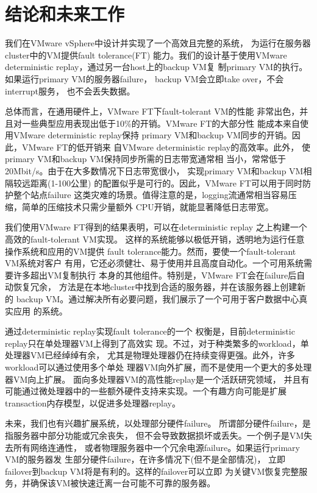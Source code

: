 \section{结论和未来工作}

我们在VMware vSphere中设计并实现了一个高效且完整的系统，%
为运行在服务器cluster中的VM提供fault tolerance(FT)%
能力。我们的设计基于使用VMware %
deterministic replay，通过另一台host上的backup VM复%
制primary VM的执行。如果运行primary VM的服务器failure，%
backup VM会立即take over，不会interrupt服务，%
也不会丢失数据。%

总体而言，在通用硬件上，VMware FT下fault-tolerant VM的性能%
非常出色，并且对一些典型应用表现出低于10\%的开销。VMware FT的大部分性%
能成本来自使用VMware deterministic replay保持%
primary VM和backup VM同步的开销。因此，VMware FT的低开销来%
自VMware deterministic replay的高效率。此外，%
使primary VM和backup VM保持同步所需的日志带宽通常相%
当小，常常低于20Mbit/s。由于在大多数情况下日志带宽很小，%
实现primary VM和backup VM相隔较远距离(1-100公里)%
的配置似乎是可行的。因此，VMware FT可以用于同时防护整个站点failure%
这类灾难的场景。值得注意的是，logging流通常相当容易压缩，简单的压缩技术只需少量额外%
CPU开销，就能显著降低日志带宽。%

我们使用VMware FT得到的结果表明，可以在deterministic replay%
之上构建一个高效的fault-tolerant VM实现。%
这样的系统能够以极低开销，透明地为运行任意操作系统和应用的VM提供%
fault tolerance能力。然而，要使一个fault-tolerant VM系统对客户%
有用，它还必须健壮、易于使用并且高度自动化。一个可用系统需要许多超出VM复制执行%
本身的其他组件。特别是，VMware FT会在failure后自动恢复冗余，%
方法是在本地cluster中找到合适的服务器，并在该服务器上创建新的%
backup VM。通过解决所有必要问题，我们展示了一个可用于客户数据中心真实应用%
的系统。%

通过deterministic replay实现fault tolerance的一个%
权衡是，目前deterministic replay只在单处理器VM上得到了高效实%
现。不过，对于种类繁多的workload，单处理器VM已经绰绰有余，%
尤其是物理处理器仍在持续变得更强。此外，许多workload可以通过使用多个单处%
理器VM向外扩展，而不是使用一个更大的多处理器VM向上扩展。%
面向多处理器VM的高性能replay是一个活跃研究领域，%
并且有可能通过微处理器中的一些额外硬件支持来实现。一个有趣方向可能是扩展%
transaction内存模型，以促进多处理器replay。%

未来，我们也有兴趣扩展系统，以处理部分硬件failure。%
所谓部分硬件failure，是指服务器中部分功能或冗余丧失，%
但不会导致数据损坏或丢失。一个例子是VM失去所有网络连通性，%
或者物理服务器中一个冗余电源failure。如果运行primary VM的服务器发%
生部分硬件failure，在许多情况下(但不是全部情况)，%
立即failover到backup VM将是有利的。这样的failover可以立即%
为关键VM恢复完整服务，并确保该VM被快速迁离一台可能不可靠的服务器。
